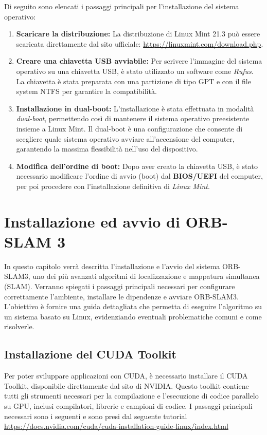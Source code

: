 \documentclass[12pt,a4paper]{report}
\begin{document}
Di seguito sono elencati i passaggi principali per l'installazione del sistema operativo:

\begin{enumerate}
    \item \textbf{Scaricare la distribuzione:} La distribuzione di Linux Mint 21.3 può essere scaricata direttamente dal sito ufficiale: \url{https://linuxmint.com/download.php}.
    \item \textbf{Creare una chiavetta USB avviabile:} Per scrivere l'immagine del sistema operativo su una chiavetta USB, è stato utilizzato un software come \textit{Rufus}. La chiavetta è stata preparata con una partizione di tipo GPT e con il file system NTFS per garantire la compatibilità.
    \item \textbf{Installazione in dual-boot:} L'installazione è stata effettuata in modalità \textit{dual-boot}, permettendo così di mantenere il sistema operativo preesistente insieme a Linux Mint. Il dual-boot è una configurazione che consente di scegliere quale sistema operativo avviare all'accensione del computer, garantendo la massima flessibilità nell'uso del dispositivo.
    \item \textbf{Modifica dell'ordine di boot:} Dopo aver creato la chiavetta USB, è stato necessario modificare l'ordine di avvio (boot) dal \textbf{BIOS/UEFI }del computer, per poi procedere con l'installazione definitiva di \textit{Linux Mint}.
\end{enumerate}


\section{Installazione ed avvio di ORB-SLAM 3}

In questo capitolo verrà descritta l'installazione e l'avvio del sistema ORB-SLAM3, uno dei più avanzati algoritmi di localizzazione e mappatura simultanea (SLAM). Verranno spiegati i passaggi principali necessari per configurare correttamente l'ambiente, installare le dipendenze e avviare ORB-SLAM3. L'obiettivo è fornire una guida dettagliata che permetta di eseguire l'algoritmo su un sistema basato su Linux, evidenziando eventuali problematiche comuni e come risolverle.

\subsection{Installazione del CUDA Toolkit}

Per poter sviluppare applicazioni con CUDA, è necessario installare il CUDA Toolkit, disponibile direttamente dal sito di NVIDIA. Questo toolkit contiene tutti gli strumenti necessari per la compilazione e l'esecuzione di codice parallelo su GPU, inclusi compilatori, librerie e campioni di codice. I passaggi principali necessari sono i seguenti e sono presi dal seguente tutorial \url{https://docs.nvidia.com/cuda/cuda-installation-guide-linux/index.html}
\end{document}
